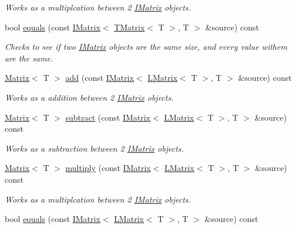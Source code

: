 \begin{DoxyCompactItemize}
\begin{DoxyCompactList}\small\item\em Works as a multiplcation between 2 \mbox{\hyperlink{class_i_matrix}{I\+Matrix}} objects. \end{DoxyCompactList}\item 
bool \mbox{\hyperlink{class_s_matrix_ab7f5292767d30a60b81b2fa119bba727}{equals}} (const \mbox{\hyperlink{class_i_matrix}{I\+Matrix}}$<$ \mbox{\hyperlink{class_t_matrix}{T\+Matrix}}$<$ T $>$, T $>$ \&source) const
\begin{DoxyCompactList}\small\item\em Checks to see if two \mbox{\hyperlink{class_i_matrix}{I\+Matrix}} objects are the same size, and every value withem are the same. \end{DoxyCompactList}\item 
\mbox{\hyperlink{class_matrix}{Matrix}}$<$ T $>$ \mbox{\hyperlink{class_s_matrix_a3d6d2c3775503773d138f646fe3e67f7}{add}} (const \mbox{\hyperlink{class_i_matrix}{I\+Matrix}}$<$ \mbox{\hyperlink{class_l_matrix}{L\+Matrix}}$<$ T $>$, T $>$ \&source) const
\begin{DoxyCompactList}\small\item\em Works as a addition between 2 \mbox{\hyperlink{class_i_matrix}{I\+Matrix}} objects. \end{DoxyCompactList}\item 
\mbox{\hyperlink{class_matrix}{Matrix}}$<$ T $>$ \mbox{\hyperlink{class_s_matrix_a5957e6d01d12d85141bb2ce3e3d55654}{subtract}} (const \mbox{\hyperlink{class_i_matrix}{I\+Matrix}}$<$ \mbox{\hyperlink{class_l_matrix}{L\+Matrix}}$<$ T $>$, T $>$ \&source) const
\begin{DoxyCompactList}\small\item\em Works as a subtraction between 2 \mbox{\hyperlink{class_i_matrix}{I\+Matrix}} objects. \end{DoxyCompactList}\item 
\mbox{\hyperlink{class_matrix}{Matrix}}$<$ T $>$ \mbox{\hyperlink{class_s_matrix_aba9d4c54e9e989a8e6e59460bec2a235}{multiply}} (const \mbox{\hyperlink{class_i_matrix}{I\+Matrix}}$<$ \mbox{\hyperlink{class_l_matrix}{L\+Matrix}}$<$ T $>$, T $>$ \&source) const
\begin{DoxyCompactList}\small\item\em Works as a multiplcation between 2 \mbox{\hyperlink{class_i_matrix}{I\+Matrix}} objects. \end{DoxyCompactList}\item 
bool \mbox{\hyperlink{class_s_matrix_a0955911949528be566ba26a734d52816}{equals}} (const \mbox{\hyperlink{class_i_matrix}{I\+Matrix}}$<$ \mbox{\hyperlink{class_l_matrix}{L\+Matrix}}$<$ T $>$, T $>$ \&source) const

\end{DoxyCompactItemize}
